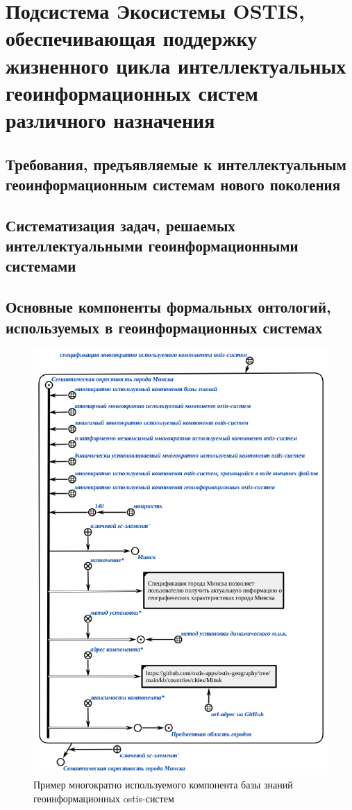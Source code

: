 \chapter{Подсистема Экосистемы OSTIS, обеспечивающая поддержку жизненного цикла интеллектуальных геоинформационных систем различного назначения}
\label{chapter_gis}


\section{Требования, предъявляемые к интеллектуальным геоинформационным системам нового поколения}
\section{Систематизация задач, решаемых интеллектуальными геоинформационными системами}
\section{Основные компоненты формальных онтологий, используемых в геоинформационных системах}
\label{gis_components}

\begin{figure}[H]
	\includegraphics[scale=0.8]{author/part7/figures/gis_kb_component.png}
	\caption{Пример многократно используемого компонента базы знаний геоинформационных ostis-систем}
	\label{fig:gis_kb_component}
\end{figure}

